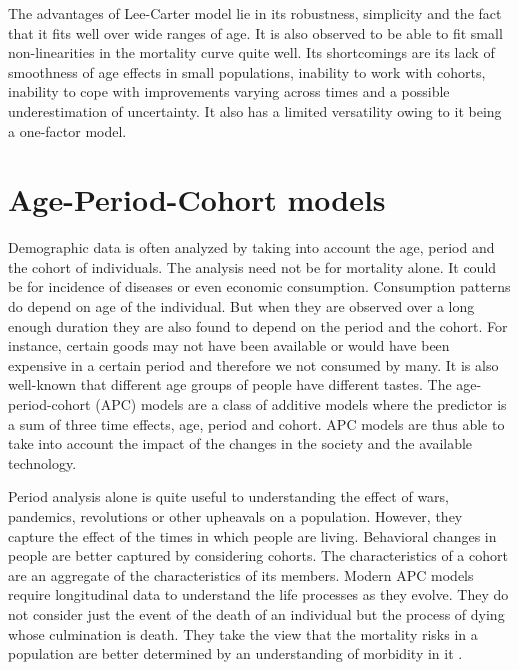 \documentclass{article}
\numberwithin{equation}{section}
\begin{document}
The advantages of Lee-Carter model lie in its robustness, simplicity and 
the fact that it fits well over wide ranges of age. It is also observed to be
able to fit small non-linearities in the mortality curve quite well. Its 
shortcomings are its lack of smoothness of age effects in small populations, 
inability to work with cohorts, inability to cope with improvements varying 
across times and a possible underestimation of uncertainty. It also has a 
limited versatility owing to it being a one-factor model.

\section{Age-Period-Cohort models}\label{s7}
Demographic data is often analyzed by taking into account the age, period 
and the cohort of individuals. The analysis need not be for mortality alone.
It could be for incidence of diseases or even economic consumption. Consumption
patterns do depend on age of the individual. But when they are observed over
a long enough duration they are also found to depend on the period and the 
cohort. For instance, certain goods may not have been available or would have
been expensive in a certain period and therefore we not consumed by many. It
is also well-known that different age groups of people have different tastes.
The age-period-cohort (APC) models are a class of additive models where the
predictor is a sum of three time effects, age, period and cohort. APC models
are thus able to take into account the impact of the changes in the society 
and the available technology.

Period analysis alone is quite useful to understanding the effect of wars,
pandemics, revolutions or other upheavals on a population. However, they
capture the effect of the times in which people are living. Behavioral
changes in people are better captured by considering cohorts. The 
characteristics of a cohort are an aggregate of the characteristics of its 
members\cite{willekens1991age}. Modern APC models require longitudinal data
to understand the life processes as they evolve. They do not consider just
the event of the death of an individual but the process of dying whose 
culmination is death. They take the view that the mortality risks in a 
population are better determined by an understanding of morbidity in it
\cite{van1990determinants}.
\end{document}
